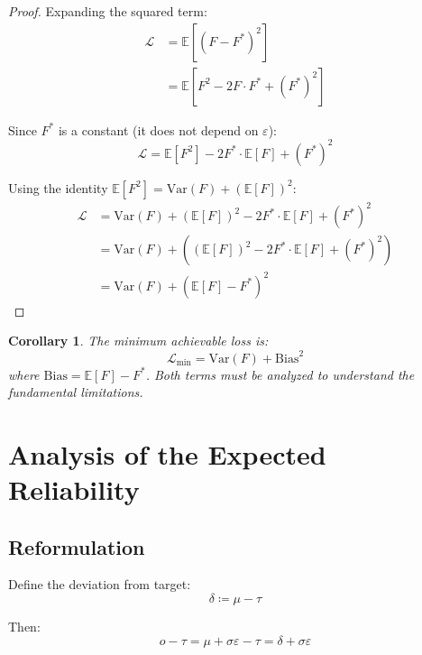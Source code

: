 \documentclass[11pt,a4paper]{article}
\newtheorem{corollary}[theorem]{Corollary}
\theoremstyle{definition}
\newcommand{\E}{\mathbb{E}}
\newcommand{\Var}{\mathrm{Var}}
\begin{document}
\begin{proof}
Expanding the squared term:
\begin{align}
    \mathcal{L} &= \E\left[(F - F^*)^2\right] \\
    &= \E\left[F^2 - 2F \cdot F^* + (F^*)^2\right]
\end{align}

Since $F^*$ is a constant (it does not depend on $\varepsilon$):
\begin{equation}
    \mathcal{L} = \E[F^2] - 2F^* \cdot \E[F] + (F^*)^2
\end{equation}

Using the identity $\E[F^2] = \Var(F) + (\E[F])^2$:
\begin{align}
    \mathcal{L} &= \Var(F) + (\E[F])^2 - 2F^* \cdot \E[F] + (F^*)^2 \\
    &= \Var(F) + \left((\E[F])^2 - 2F^* \cdot \E[F] + (F^*)^2\right) \\
    &= \Var(F) + \left(\E[F] - F^*\right)^2
\end{align}
\end{proof}

\begin{corollary}
The minimum achievable loss is:
\begin{equation}
    \mathcal{L}_{\min} = \Var(F) + \mathrm{Bias}^2
\end{equation}
where $\mathrm{Bias} = \E[F] - F^*$. Both terms must be analyzed to understand the fundamental limitations.
\end{corollary}

\section{Analysis of the Expected Reliability}

\subsection{Reformulation}

Define the deviation from target:
\begin{equation}
    \delta \coloneqq \mu - \tau
\end{equation}

Then:
\begin{equation}
    o - \tau = \mu + \sigma\varepsilon - \tau = \delta + \sigma\varepsilon
\end{equation}
\end{document}
